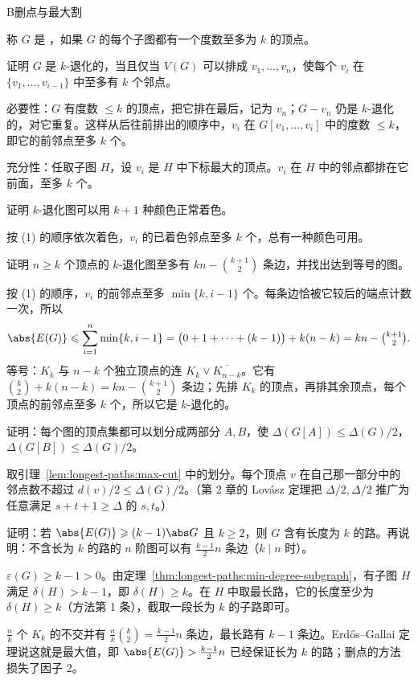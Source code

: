 \begin{exercises}{B}{删点与最大割}
\item\label{ex:longest-paths:B1} 称 $G$ 是 ，如果 $G$ 的每个子图都有一个度数至多为 $k$ 的顶点。
\begin{questions}
\item 证明 $G$ 是 $k$-退化的，当且仅当 $V(G)$ 可以排成 $v_1,\dots,v_n$，使每个 $v_i$ 在 $\{v_1,\dots,v_{i-1}\}$ 中至多有 $k$ 个邻点。
\begin{solution}
必要性：$G$ 有度数 $\leqslant k$ 的顶点，把它排在最后，记为 $v_n$；$G-v_n$ 仍是 $k$-退化的，对它重复。这样从后往前排出的顺序中，$v_i$ 在 $G[v_1,\dots,v_i]$ 中的度数 $\leqslant k$，即它的前邻点至多 $k$ 个。

充分性：任取子图 $H$，设 $v_i$ 是 $H$ 中下标最大的顶点。$v_i$ 在 $H$ 中的邻点都排在它前面，至多 $k$ 个。
\end{solution}
\item 证明 $k$-退化图可以用 $k+1$ 种颜色正常着色。
\begin{solution}
按 (1) 的顺序依次着色，$v_i$ 的已着色邻点至多 $k$ 个，总有一种颜色可用。
\end{solution}
\item 证明 $n\geqslant k$ 个顶点的 $k$-退化图至多有 $kn-\binom{k+1}2$ 条边，并找出达到等号的图。
\begin{solution}
按 (1) 的顺序，$v_i$ 的前邻点至多 $\min\{k,i-1\}$ 个。每条边恰被它较后的端点计数一次，所以
\[
\abs{E(G)}\leqslant\sum_{i=1}^n\min\{k,i-1\}=\bigl(0+1+\dots+(k-1)\bigr)+k(n-k)=kn-\tbinom{k+1}2 .
\]
等号：$K_k$ 与 $n-k$ 个独立顶点的连 $K_k\vee\overline{K_{n-k}}$。它有 $\binom k2+k(n-k)=kn-\binom{k+1}2$ 条边；先排 $K_k$ 的顶点，再排其余顶点，每个顶点的前邻点至多 $k$ 个，所以它是 $k$-退化的。
\end{solution}
\end{questions}

\item\label{ex:longest-paths:B2} 证明：每个图的顶点集都可以划分成两部分 $A,B$，使 $\Delta(G[A])\leqslant\Delta(G)/2$，$\Delta(G[B])\leqslant\Delta(G)/2$。
\begin{solution}
取引理~\ref{lem:longest-paths:max-cut} 中的划分。每个顶点 $v$ 在自己那一部分中的邻点数不超过 $d(v)/2\leqslant\Delta(G)/2$。（第 2 章的 Lovász 定理把 $\Delta/2,\Delta/2$ 推广为任意满足 $s+t+1\geqslant\Delta$ 的 $s,t$。）
\end{solution}

\item\label{ex:longest-paths:B3} 证明：若 $\abs{E(G)}\geqslant(k-1)\abs G$ 且 $k\geqslant2$，则 $G$ 含有长度为 $k$ 的路。再说明：不含长为 $k$ 的路的 $n$ 阶图可以有 $\frac{k-1}2n$ 条边（$k\mid n$ 时）。
\begin{solution}
$\varepsilon(G)\geqslant k-1>0$。由定理~\ref{thm:longest-paths:min-degree-subgraph}，有子图 $H$ 满足 $\delta(H)>k-1$，即 $\delta(H)\geqslant k$。在 $H$ 中取最长路，它的长度至少为 $\delta(H)\geqslant k$（方法第 1 条），截取一段长为 $k$ 的子路即可。

$\frac nk$ 个 $K_k$ 的不交并有 $\frac nk\binom k2=\frac{k-1}2n$ 条边，最长路有 $k-1$ 条边。Erdős--Gallai 定理说这就是最大值，即 $\abs{E(G)}>\frac{k-1}2n$ 已经保证长为 $k$ 的路；删点的方法损失了因子 $2$。
\end{solution}
\end{exercises}
